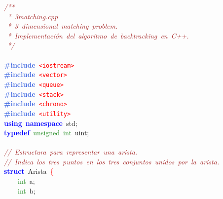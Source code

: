 \noindent
\mbox{}\textit{\textcolor{Brown}{/**}} \\
\mbox{}\textit{\textcolor{Brown}{\ *\ 3matching.cpp}} \\
\mbox{}\textit{\textcolor{Brown}{\ *\ 3\ dimensional\ matching\ problem.}} \\
\mbox{}\textit{\textcolor{Brown}{\ *\ Implementación\ del\ algoritmo\ de\ backtracking\ en\ C++.}} \\
\mbox{}\textit{\textcolor{Brown}{\ */}} \\
\mbox{} \\
\mbox{}\textbf{\textcolor{RoyalBlue}{\#include}}\ \texttt{\textcolor{Red}{\textless{}iostream\textgreater{}}} \\
\mbox{}\textbf{\textcolor{RoyalBlue}{\#include}}\ \texttt{\textcolor{Red}{\textless{}vector\textgreater{}}} \\
\mbox{}\textbf{\textcolor{RoyalBlue}{\#include}}\ \texttt{\textcolor{Red}{\textless{}queue\textgreater{}}} \\
\mbox{}\textbf{\textcolor{RoyalBlue}{\#include}}\ \texttt{\textcolor{Red}{\textless{}stack\textgreater{}}} \\
\mbox{}\textbf{\textcolor{RoyalBlue}{\#include}}\ \texttt{\textcolor{Red}{\textless{}chrono\textgreater{}}} \\
\mbox{}\textbf{\textcolor{RoyalBlue}{\#include}}\ \texttt{\textcolor{Red}{\textless{}utility\textgreater{}}} \\
\mbox{}\textbf{\textcolor{Blue}{using}}\ \textbf{\textcolor{Blue}{namespace}}\ std\textcolor{BrickRed}{;} \\
\mbox{}\textbf{\textcolor{Blue}{typedef}}\ \textcolor{ForestGreen}{unsigned}\ \textcolor{ForestGreen}{int}\ uint\textcolor{BrickRed}{;} \\
\mbox{} \\
\mbox{}\textit{\textcolor{Brown}{//\ Estructura\ para\ representar\ una\ arista.}} \\
\mbox{}\textit{\textcolor{Brown}{//\ Indica\ los\ tres\ puntos\ en\ los\ tres\ conjuntos\ unidos\ por\ la\ arista.}} \\
\mbox{}\textbf{\textcolor{Blue}{struct}}\ \textcolor{TealBlue}{Arista}\ \textcolor{Red}{\{} \\
\mbox{}\ \ \ \ \textcolor{ForestGreen}{int}\ a\textcolor{BrickRed}{;} \\
\mbox{}\ \ \ \ \textcolor{ForestGreen}{int}\ b\textcolor{BrickRed}{;} \\
